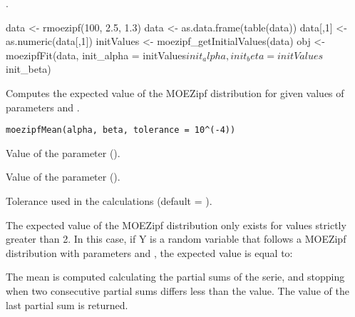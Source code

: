 \documentclass[letterpaper]{book}
\begin{document}
%
\begin{SeeAlso}\relax
{}.
\end{SeeAlso}
%
\begin{Examples}
\begin{ExampleCode}
data <- rmoezipf(100, 2.5, 1.3)
data <- as.data.frame(table(data))
data[,1] <- as.numeric(data[,1])
initValues <- moezipf_getInitialValues(data)
obj <- moezipfFit(data, init_alpha = initValues$init_alpha, init_beta = initValues$init_beta)
\end{ExampleCode}
\end{Examples}
%
\begin{Description}\relax
Computes the expected value of the MOEZipf distribution for given values of parameters
\eqn{\alpha}{} and \eqn{\beta}{}.
\end{Description}
%
\begin{Usage}
\begin{verbatim}
moezipfMean(alpha, beta, tolerance = 10^(-4))
\end{verbatim}
\end{Usage}
%
\begin{Arguments}
\begin{ldescription}
\item[\code{alpha}] Value of the \eqn{\alpha}{} parameter ().

\item[\code{beta}] Value of the \eqn{\beta}{} parameter ().

\item[\code{tolerance}] Tolerance used in the calculations (default = ).
\end{ldescription}
\end{Arguments}
%
\begin{Details}\relax
The expected value of the MOEZipf distribution only exists for \eqn{\alpha}{} values strictly greater than 2.
In this case, if Y is a random variable that follows a MOEZipf distribution with parameters \eqn{\alpha}{}
and \eqn{\beta}{}, the expected value is equal to:

The mean is computed calculating the partial sums of the serie, and stopping when two
consecutive partial sums differs less than the  value.
The value of the last partial sum is returned.
\end{Details}
\end{document}
